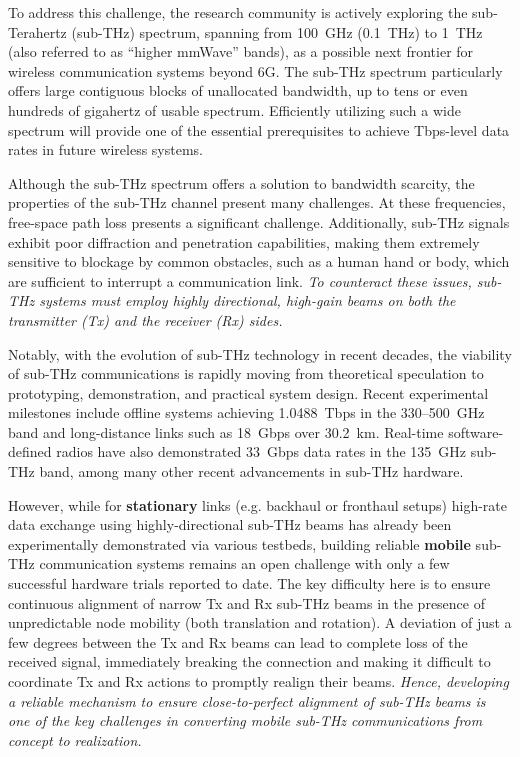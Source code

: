 \documentclass[fleqn,10pt]{wlscirep}
\begin{document}
To address this challenge, the research community is actively exploring the sub-Terahertz (sub-THz) spectrum, spanning from 100~GHz (0.1~THz) to 1~THz (also referred to as ``higher mmWave'' bands\cite{9269931}), as a possible next frontier for wireless communication systems beyond 6G\cite{Kleine-Ostmann2011, Dang2020, DeAlwis2021, Samsung2020, Rappaport2019, 10494372}. The sub-THz spectrum particularly offers large contiguous blocks of unallocated bandwidth, up to tens or even hundreds of gigahertz of usable spectrum\cite{10171235, 9766110}. Efficiently utilizing such a wide spectrum will provide one of the essential prerequisites to achieve Tbps-level data rates in future wireless systems\cite{Nokia2022}.

Although the sub-THz spectrum offers a solution to bandwidth scarcity, the properties of the sub-THz channel present many challenges. At these frequencies, free-space path loss presents a significant challenge\cite{10422992, Yu2025Research, Kleine-Ostmann2011}. Additionally, sub-THz signals exhibit poor diffraction and penetration capabilities, making them extremely sensitive to blockage by common obstacles, such as a human hand or body, which are sufficient to interrupt a communication link\cite{10494372, Jornet2023}. \emph{To counteract these issues, sub-THz systems must employ highly directional, high-gain beams on both the transmitter (Tx) and the receiver (Rx) sides\cite{Kleine-Ostmann2011}.}

Notably, with the evolution of sub-THz technology in recent decades\cite{9766110, 10579941}, the viability of sub-THz communications is rapidly moving from theoretical speculation to prototyping, demonstration, and practical system design. Recent experimental milestones include offline systems achieving 1.0488~Tbps in the 330--500~GHz band and long-distance links such as 18~Gbps over 30.2~km\cite{Yu2025Research}. Real-time software-defined radios have also demonstrated 33~Gbps data rates in the 135~GHz sub-THz band\cite{9798100,10704668}, among many other recent advancements in sub-THz hardware.

However, while for \textbf{stationary} links (e.g. backhaul or fronthaul setups) high-rate data exchange using highly-directional sub-THz beams has already been experimentally demonstrated via various testbeds\cite{Sen2023, Li2024THz84Gbps, Samsung2021_140GHz}, building reliable \textbf{mobile} sub-THz communication systems remains an open challenge with only a few successful hardware trials reported to date\cite{Han2025THz_ISAC, Petrov2023Mobile}. The key difficulty here is to ensure continuous alignment of narrow Tx and Rx sub-THz beams in the presence of unpredictable node mobility (both translation and rotation)\cite{Stepanov2021, Wang2022, Petrov2023Mobile}. A deviation of just a few degrees between the Tx and Rx beams can lead to complete loss of the received signal, immediately breaking the connection and making it difficult to coordinate Tx and Rx actions to promptly realign their beams. \emph{Hence, developing a reliable mechanism to ensure close-to-perfect alignment of sub-THz beams is one of the key challenges in converting mobile sub-THz communications from concept to realization\cite{10036372, Petrov2023Mobile, Azari2022}.}
\end{document}
